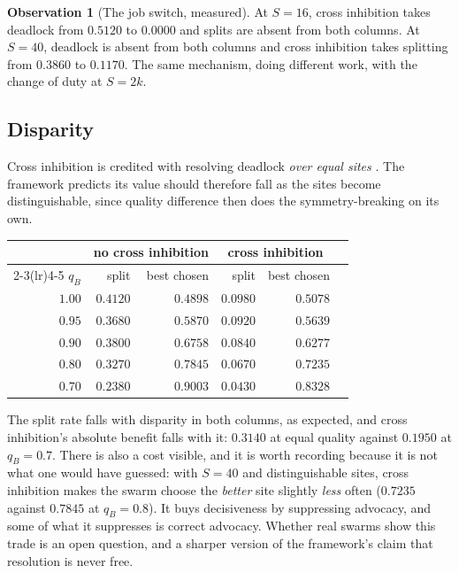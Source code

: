 \documentclass[11pt,a4paper]{article}
\theoremstyle{plain}
\theoremstyle{definition}
\newtheorem{observation}[theorem]{Observation}
\theoremstyle{remark}
\begin{document}
\begin{observation}[The job switch, measured]\label{obs:jobswitch}
At $S = 16$, cross inhibition takes deadlock from $0.5120$ to $0.0000$ and
splits are absent from both columns. At $S = 40$, deadlock is absent from both
columns and cross inhibition takes splitting from $0.3860$ to $0.1170$. The
same mechanism, doing different work, with the change of duty at $S = 2k$.
\end{observation}

\subsection{Disparity}

Cross inhibition is credited with resolving deadlock \emph{over equal sites}
\cite{Seeley12}. The framework predicts its value should therefore fall as the
sites become distinguishable, since quality difference then does the
symmetry-breaking on its own.

\begin{center}
\begin{tabular}{@{}rrrrrr@{}}
\toprule
& \multicolumn{2}{c}{no cross inhibition} & \multicolumn{2}{c}{cross inhibition}\\
\cmidrule(lr){2-3}\cmidrule(lr){4-5}
$q_B$ & split & best chosen & split & best chosen\\
\midrule
$1.00$ & $0.4120$ & $0.4898$ & $0.0980$ & $0.5078$\\
$0.95$ & $0.3680$ & $0.5870$ & $0.0920$ & $0.5639$\\
$0.90$ & $0.3800$ & $0.6758$ & $0.0840$ & $0.6277$\\
$0.80$ & $0.3270$ & $0.7845$ & $0.0670$ & $0.7235$\\
$0.70$ & $0.2380$ & $0.9003$ & $0.0430$ & $0.8328$\\
\bottomrule
\end{tabular}
\end{center}

The split rate falls with disparity in both columns, as expected, and cross
inhibition's absolute benefit falls with it: $0.3140$ at equal quality against
$0.1950$ at $q_B = 0.7$. There is also a cost visible, and it is worth
recording because it is not what one would have guessed: with $S = 40$ and
distinguishable sites, cross inhibition makes the swarm choose the \emph{better}
site slightly \emph{less} often ($0.7235$ against $0.7845$ at $q_B = 0.8$). It
buys decisiveness by suppressing advocacy, and some of what it suppresses is
correct advocacy. Whether real swarms show this trade is an open question, and
a sharper version of the framework's claim that resolution is never free.
\end{document}
